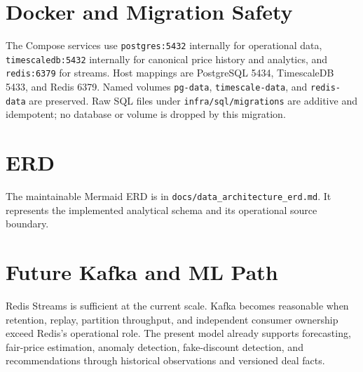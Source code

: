 \documentclass[11pt]{article}
\begin{document}
\section{Docker and Migration Safety}
The Compose services use \texttt{postgres:5432} internally for operational
data, \texttt{timescaledb:5432} internally for canonical price history and analytics,
and \texttt{redis:6379} for streams. Host mappings are PostgreSQL 5434,
TimescaleDB 5433, and Redis 6379. Named volumes \texttt{pg-data},
\texttt{timescale-data}, and \texttt{redis-data} are preserved. Raw SQL files
under \texttt{infra/sql/migrations} are additive and idempotent; no database or
volume is dropped by this migration.

\section{ERD}
The maintainable Mermaid ERD is in \texttt{docs/data\_architecture\_erd.md}.
It represents the implemented analytical schema and its operational source
boundary.

\section{Future Kafka and ML Path}
Redis Streams is sufficient at the current scale. Kafka becomes reasonable when
retention, replay, partition throughput, and independent consumer ownership
exceed Redis's operational role. The present model already supports forecasting,
fair-price estimation, anomaly detection, fake-discount detection, and
recommendations through historical observations and versioned deal facts.
\end{document}
